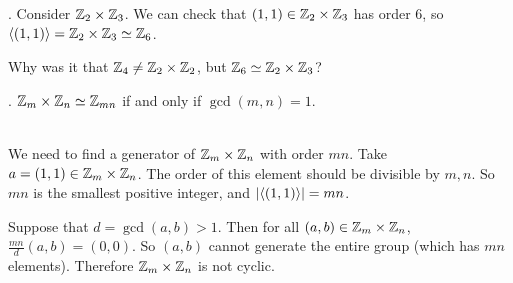 \ex. Consider \(\mathbb{Z}_2 \times \mathbb{Z}_3\). We can check that \((1, 1) \in \mathbb{Z}_2 \times \mathbb{Z}_3\) has order 6, so \(\left\langle (1, 1) \right\rangle = \mathbb{Z}_2 \times \mathbb{Z}_3 \simeq \mathbb{Z}_6\).

Why was it that \(\mathbb{Z}_4 \neq \mathbb{Z}_2 \times \mathbb{Z}_2\), but \(\mathbb{Z}_6 \simeq \mathbb{Z}_2 \times \mathbb{Z}_3\)?

\thm. \(\mathbb{Z}_m \times \mathbb{Z}_n \simeq \mathbb{Z}_{mn}\) if and only if \(\gcd(m, n) = 1\).

\pf \\
\note{\mimpd} We need to find a generator of \(\mathbb{Z}_m \times \mathbb{Z}_n\) with order \(mn\). Take \(a = (1, 1) \in \mathbb{Z}_m \times \mathbb{Z}_n\). The order of this element should be divisible by \(m, n\). So \(mn\) is the smallest positive integer, and \(\left| \left\langle (1, 1) \right\rangle \right| = mn\).

\note{\mimp} Suppose that \(d = \gcd(a, b) > 1\). Then for all \((a, b) \in \mathbb{Z}_m \times \mathbb{Z}_n\), \(\frac{mn}{d}(a, b) = (0, 0)\). So \((a, b)\) cannot generate the entire group (which has \(mn\) elements). Therefore \(\mathbb{Z}_m \times \mathbb{Z}_n\) is not cyclic.

\pagebreak
